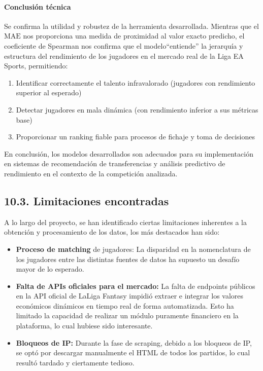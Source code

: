 \paragraph{Conclusión técnica}

Se confirma la utilidad y robustez de la herramienta
desarrollada. Mientras que el $\mathrm{MAE}$ nos proporciona una 
medida de proximidad al valor exacto predicho, el coeficiente de 
Spearman nos confirma que el modelo``entiende'' la 
jerarquía y estructura del rendimiento de los jugadores en el 
mercado real de la Liga EA Sports, permitiendo:

\begin{enumerate}
  \item Identificar correctamente el talento infravalorado
        (jugadores con rendimiento superior al esperado)
  
  \item Detectar jugadores en mala dinámica (con 
        rendimiento inferior a sus métricas base)
  
  \item Proporcionar un ranking fiable para procesos de 
        fichaje y toma de decisiones
\end{enumerate}

En conclusión, los modelos desarrollados son adecuados para su 
implementación en sistemas de recomendación de transferencias y 
análisis predictivo de rendimiento en el contexto de la 
competición analizada.

\subsection{10.3. Limitaciones encontradas}

A lo largo del proyecto, se han identificado ciertas limitaciones inherentes a la obtención y procesamiento de los datos, los más destacados han sido:
\begin{itemize}
    \item \textbf{Proceso de matching} de jugadores: La disparidad en la nomenclatura de los jugadores entre las distintas fuentes de datos ha supuesto un desafío mayor de lo esperado.
    \item \textbf{Falta de APIs oficiales para el mercado:} La falta de endpoints públicos en la API oficial de LaLiga Fantasy impidió extraer e integrar los valores económicos dinámicos en tiempo real de forma automatizada. Esto ha limitado la capacidad de realizar un módulo puramente financiero en la plataforma, lo cual hubiese sido interesante.
    \item \textbf{Bloqueos de IP:} Durante la fase de scraping, debido a los bloqueos de IP, se optó por descargar manualmente el HTML de todos los partidos, lo cual resultó tardado y ciertamente tedioso.
\end{itemize}

